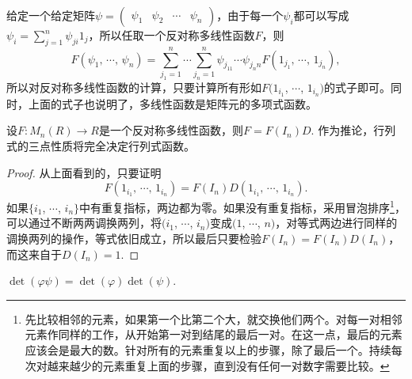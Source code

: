 \para 给定一个给定矩阵$\psi=\begin{pmatrix}\psi_{1} & \psi_{2} & \cdots & \psi_{n}\end{pmatrix}$，由于每一个$\psi_i$都可以写成$\psi_i=\sum_{j=1}^n\psi_{ji}1_j$，所以任取一个反对称多线性函数$F$，则
\[
	F(\psi_1,\,\cdots\!,\,\psi_n)=\sum_{j_1=1}^n\cdots \sum_{j_n=1}^n \psi_{j_11}\cdots \psi_{j_n n} F(1_{j_1},\,\cdots\!,\,1_{j_n}),
\]
所以对反对称多线性函数的计算，只要计算所有形如$F(1_{i_1}$, $\cdots$, $1_{i_n})$的式子即可。同时，上面的式子也说明了，多线性函数是矩阵元的多项式函数。

\begin{pro}
设$F:M_n(R)\to R$是一个反对称多线性函数，则$F=F(I_n)D$. 作为推论，行列式的三点性质将完全决定行列式函数。
\end{pro}

\begin{proof} 
	从上面看到的，只要证明
	\[
		F(1_{i_1},\,\cdots\!,\,1_{i_n})=F(I_n)D(1_{i_1},\,\cdots\!,\,1_{i_n}).
	\]
	如果$\{i_1$, $\cdots$, $i_n\}$中有重复指标，两边都为零。如果没有重复指标，采用冒泡排序\footnote{先比较相邻的元素，如果第一个比第二个大，就交换他们两个。对每一对相邻元素作同样的工作，从开始第一对到结尾的最后一对。在这一点，最后的元素应该会是最大的数。针对所有的元素重复以上的步骤，除了最后一个。持续每次对越来越少的元素重复上面的步骤，直到没有任何一对数字需要比较。}，可以通过不断两两调换两列，将$(i_1$, $\cdots$, $i_n)$变成$(1$, $\cdots$, $n)$，对等式两边进行同样的调换两列的操作，等式依旧成立，所以最后只要检验$F(I_n)=F(I_n)D(I_n)$，而这来自于$D(I_n)=1$.
\end{proof}

\begin{pro}[行列式乘法公式]
$\det(\varphi \psi)=\det(\varphi)\det(\psi)$.
\end{pro}

